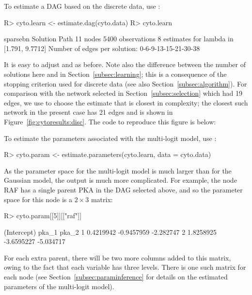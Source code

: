\documentclass[article]{jss}
\renewcommand{\|}{\,|\,}
\begin{document}
To estimate a DAG based on the discrete data, use :
%
\begin{CodeChunk}
\begin{CodeInput}
R> cyto.learn <- estimate.dag(cyto.data)
R> cyto.learn
\end{CodeInput}
\begin{CodeOutput}
sparsebn Solution Path
 11 nodes
 5400 observations
 8 estimates for lambda in [1.791, 9.7712]
 Number of edges per solution: 0-6-9-13-15-21-30-38
\end{CodeOutput}
\end{CodeChunk}
%
It is easy to adjust  and  as before. Note also the difference between the number of solutions here and in Section~\ref{subsec:learning}; this is a consequence of the stopping criterion used for discrete data (see also Section~\ref{subsec:algorithm}). For comparison with the network selected in Section~\ref{subsec:selection} which had 19 edges, we use  to choose the estimate that is closest in complexity; the closest such network in the present case has 21 edges and is shown in Figure~\ref{fig:cytoresults:disc}. The code to reproduce this figure is below:
%
\begin{CodeChunk}
\end{CodeChunk}
%
To estimate the parameters associated with the multi-logit model, use :
%
\begin{CodeChunk}
\begin{CodeInput}
R> cyto.param <- estimate.parameters(cyto.learn, data = cyto.data)
\end{CodeInput}
\end{CodeChunk}
%
As the parameter space for the multi-logit model is much larger than for the Gaussian model, the output is much more complicated. For example, the node RAF has a single parent PKA in the DAG selected above, and so the parameter space for this node is a $2$ matrix:
%
\begin{CodeChunk}
\begin{CodeInput}
R> cyto.param[[5]][["raf"]]
\end{CodeInput}

\begin{CodeOutput}
      (Intercept)      pka_1     pka_2
    1   0.4219942 -0.9457959 -2.282747
    2   1.8258925 -3.6595227 -5.034717
\end{CodeOutput}
\end{CodeChunk}
%
For each extra parent, there will be two more columns added to this matrix, owing to the fact that each variable has three levels. There is one such matrix for each node (see Section~\ref{subsec:paraminference} for details on the estimated parameters of the multi-logit model). 
\end{document}
